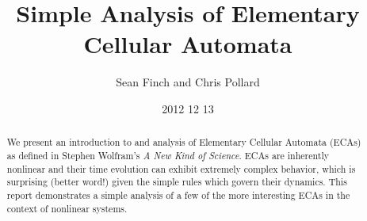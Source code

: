 \documentclass{article}
\author{Sean Finch and Chris Pollard}
\date{2012 12 13}
\title{Simple Analysis of Elementary Cellular Automata}
\begin{document}
\maketitle

\vspace{3in}

\begin{abstract}
    We present an introduction to and analysis of Elementary Cellular
    Automata (ECAs) as defined in Stephen Wolfram's
    \emph{A New Kind of Science}.
    ECAs are inherently nonlinear and their time evolution can
    exhibit extremely complex behavior, which is surprising (better
    word!) given the simple rules which govern their dynamics.
    This report demonstrates a simple analysis of a few of the more
    interesting ECAs in the context of nonlinear systems.
\end{abstract}

\newpage









\end{document}
